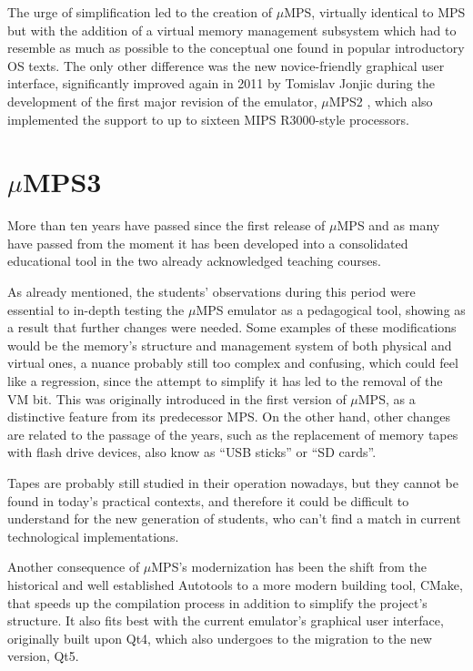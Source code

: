 \documentclass[12pt,a4paper,openright,twoside]{report}
\begin{document}
	The urge of simplification led to the creation of $\mu$MPS, virtually identical to MPS but with the addition of a virtual memory management subsystem which had to resemble as much as possible to the conceptual one found in popular introductory OS texts.
	The only other difference was the new novice-friendly graphical user interface, significantly improved again in 2011 by Tomislav Jonjic during the development of the first major revision of the emulator, $\mu$MPS2 \cite{umps2}, which also implemented the support to up to sixteen MIPS R3000-style processors.

\section{$\mu$MPS3}
	More than ten years have passed since the first release of $\mu$MPS and as many have passed from the moment it has been developed into a consolidated educational tool in the two already acknowledged teaching courses.
	
	As already mentioned, the students' observations during this period were essential to in-depth testing the $\mu$MPS emulator as a pedagogical tool, showing as a result that further changes were needed.
	Some examples of these modifications would be the memory's structure and management system of both physical and virtual ones, a nuance probably still too complex and confusing, which could feel like a regression, since the attempt to simplify it has led to the removal of the VM bit.
	This was originally introduced in the first version of $\mu$MPS, as a distinctive feature from its predecessor MPS.
	On the other hand, other changes are related to the passage of the years, such as the replacement of memory tapes with flash drive devices, also know as ``USB sticks'' or ``SD cards''.
	
	Tapes are probably still studied in their operation nowadays, but they cannot be found in today's practical contexts, and therefore it could be difficult to understand for the new generation of students, who can't find a match in current technological implementations.
	
	Another consequence of $\mu$MPS's modernization has been the shift from the historical and well established Autotools to a more modern building tool, CMake, that speeds up the compilation process in addition to simplify the project's structure.
	It also fits best with the current emulator's graphical user interface, originally built upon Qt4, which also undergoes to the migration to the new version, Qt5.
	
\end{document}
